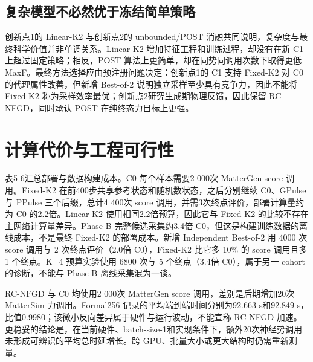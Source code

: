 \subsection{复杂模型不必然优于冻结简单策略}

创新点1的 Linear-K2 与创新点2的 unbounded/POST 消融共同说明，复杂度与最终科学价值并非单调关系。Linear-K2 增加特征工程和训练过程，却没有在新 C1 上超过固定策略；相反，POST 算法上更简单，却在同势同调用次数下取得更低 MaxF。最终方法选择应由预注册问题决定：创新点1的 C1 支持 Fixed-K2 对 C0 的代理属性改善，但新增 Best-of-2 说明独立采样至少具有竞争力，因此不能将 Fixed-K2 称为采样效率最优；创新点2研究生成期物理反馈，因此保留 RC-NFGD，同时承认 POST 在纯终态力目标上更强。

\section{计算代价与工程可行性}

表5-6汇总部署与数据构建成本。C0 每个样本需要2 000次 MatterGen score 调用。Fixed-K2 在前400步共享参考状态和随机数状态，之后分别继续 C0、GPulse 与 PPulse 三个后缀，总计4 400次 score 调用，并需3次终点评价，部署计算量约为 C0 的2.2倍。Linear-K2 使用相同2.2倍预算，因此它与 Fixed-K2 的比较不存在主网络计算量差异。Phase B 完整候选采集约3.4倍 C0，但这是构建训练数据的离线成本，不是最终 Fixed-K2 的部署成本。新增 Independent Best-of-2 用 4000 次 score 调用与 2 次终点评价（2.0倍 C0），Fixed-K2 比它多 10\% 的 score 调用且多 1 个终点。K=4 预算实验使用 6800 次与 5 个终点（3.4倍 C0），属于另一 cohort 的诊断，不能与 Phase B 离线采集混为一谈。

RC-NFGD 与 C0 均使用2 000次 MatterGen score 调用，差别是后期增加20次 Matter\allowbreak Sim 力调用。Formal256 记录的平均端到端时间分别为92.663 s和92.849 s，比值0.9980；该微小反向差异属于硬件与运行波动，不能宣称 RC-NFGD 加速。更稳妥的结论是，在当前硬件、batch-size-1和实现条件下，额外20次神经势调用未形成可辨识的平均总时延增长。跨 GPU、批量大小或更大结构时仍需重新测量。


